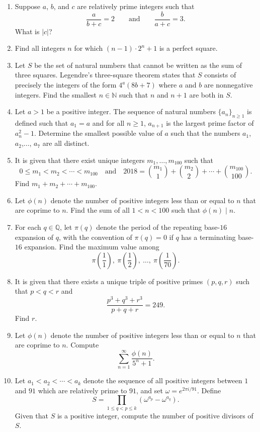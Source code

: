 \documentclass[10pt]{article}
\begin{document}
\begin{enumerate}
\item Suppose $a$, $b$, and $c$ are relatively prime integers such that \[\frac{a}{b+c} = 2\qquad\text{and}\qquad \frac{b}{a+c} = 3.\] What is $|c|$?

\item Find all integers $n$ for which $(n-1)\cdot 2^n + 1$ is a perfect square.

\item Let $S$ be the set of natural numbers that cannot be written as the sum of three squares. Legendre's three-square theorem states that $S$ consists of precisely the integers of the form $4^a(8b+7)$ where $a$ and $b$ are nonnegative integers. Find the smallest $n\in\mathbb N$ such that $n$ and $n+1$ are both in $S$.

\item Let $a>1$ be a positive integer.  The sequence of natural numbers $\{a_n\}_{n\geq 1}$ is defined such that $a_1 = a$ and for all $n\geq 1$, $a_{n+1}$ is the largest prime factor of $a_n^2 - 1$.  Determine the smallest possible value of $a$ such that the numbers $a_1$, $a_2$,$\ldots$, $a_7$ are all distinct.

\item It is given that there exist unique integers $m_1,\ldots, m_{100}$ such that \[0\leq m_1 < m_2 < \cdots < m_{100}\quad\text{and}\quad 2018 = \binom{m_1}1 + \binom{m_2}2 + \cdots + \binom{m_{100}}{100}.\] Find $m_1 + m_2 + \cdots + m_{100}$.

\item Let $\phi(n)$ denote the number of positive integers less than or equal to $n$ that are coprime to $n$. Find the sum of all $1<n<100$ such that $\phi(n)\mid n$.

\item For each $q\in\mathbb Q$, let $\pi(q)$ denote the period of the repeating base-$16$ expansion of $q$, with the convention of $\pi(q)=0$ if $q$ has a terminating base-$16$ expansion. Find the maximum value among \[\pi\left(\frac11\right),~\pi\left(\frac12\right),~\dots,~\pi\left(\frac1{70}\right).\]

\item It is given that there exists a unique triple of positive primes $(p,q,r)$ such that $p<q<r$ and \[\dfrac{p^3+q^3+r^3}{p+q+r} = 249.\] Find $r$.

\item Let $\phi(n)$ denote the number of positive integers less than or equal to $n$ that are coprime to $n$. Compute \[\sum_{n=1}^{\infty}\frac{\phi(n)}{5^n+1}.\]

\item Let $a_1 < a_2 < \cdots < a_k$ denote the sequence of all positive integers between $1$ and $91$ which are relatively prime to $91$, and set $\omega = e^{2\pi i/91}$. Define \[S = \prod_{1\leq q < p\leq k}\left(\omega^{a_p} - \omega^{a_q}\right).\] Given that $S$ is a positive integer, compute the number of positive divisors of $S$.
\end{enumerate}
\end{document}
